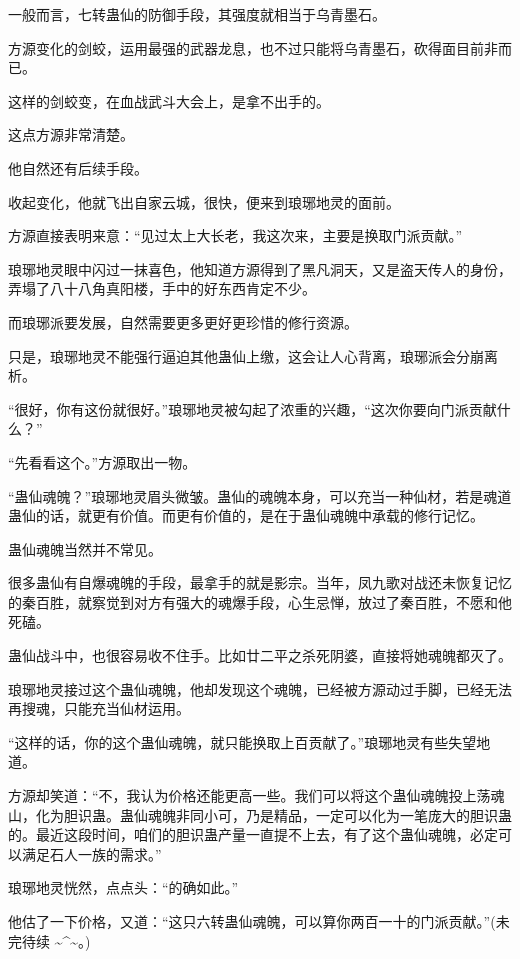 \begin{this_body}
一般而言，七转蛊仙的防御手段，其强度就相当于乌青墨石。

方源变化的剑蛟，运用最强的武器龙息，也不过只能将乌青墨石，砍得面目前非而已。

这样的剑蛟变，在血战武斗大会上，是拿不出手的。

这点方源非常清楚。

他自然还有后续手段。

收起变化，他就飞出自家云城，很快，便来到琅琊地灵的面前。

方源直接表明来意：“见过太上大长老，我这次来，主要是换取门派贡献。”

琅琊地灵眼中闪过一抹喜色，他知道方源得到了黑凡洞天，又是盗天传人的身份，弄塌了八十八角真阳楼，手中的好东西肯定不少。

而琅琊派要发展，自然需要更多更好更珍惜的修行资源。

只是，琅琊地灵不能强行逼迫其他蛊仙上缴，这会让人心背离，琅琊派会分崩离析。

“很好，你有这份就很好。”琅琊地灵被勾起了浓重的兴趣，“这次你要向门派贡献什么？”

“先看看这个。”方源取出一物。

“蛊仙魂魄？”琅琊地灵眉头微皱。蛊仙的魂魄本身，可以充当一种仙材，若是魂道蛊仙的话，就更有价值。而更有价值的，是在于蛊仙魂魄中承载的修行记忆。

蛊仙魂魄当然并不常见。

很多蛊仙有自爆魂魄的手段，最拿手的就是影宗。当年，凤九歌对战还未恢复记忆的秦百胜，就察觉到对方有强大的魂爆手段，心生忌惮，放过了秦百胜，不愿和他死磕。

蛊仙战斗中，也很容易收不住手。比如廿二平之杀死阴婆，直接将她魂魄都灭了。

琅琊地灵接过这个蛊仙魂魄，他却发现这个魂魄，已经被方源动过手脚，已经无法再搜魂，只能充当仙材运用。

“这样的话，你的这个蛊仙魂魄，就只能换取上百贡献了。”琅琊地灵有些失望地道。

方源却笑道：“不，我认为价格还能更高一些。我们可以将这个蛊仙魂魄投上荡魂山，化为胆识蛊。蛊仙魂魄非同小可，乃是精品，一定可以化为一笔庞大的胆识蛊的。最近这段时间，咱们的胆识蛊产量一直提不上去，有了这个蛊仙魂魄，必定可以满足石人一族的需求。”

琅琊地灵恍然，点点头：“的确如此。”

他估了一下价格，又道：“这只六转蛊仙魂魄，可以算你两百一十的门派贡献。”(未完待续 \~{}\^{}\~{}。)

\end{this_body}

